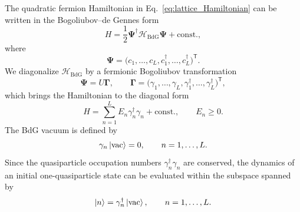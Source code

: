 \documentclass[reprint,amsmath,amssymb,aps,showkeys,superscriptaddress]{revtex4-2}
\begin{document}
The quadratic fermion Hamiltonian in
Eq.~\eqref{eq:lattice_Hamiltonian} can be written in the
Bogoliubov--de Gennes form
\begin{equation}
  H
  =
  \frac{1}{2}
  \boldsymbol{\Psi}^{\dagger}
  \mathcal{H}_{\mathrm{BdG}}
  \boldsymbol{\Psi}
  +\text{const.},
  \label{eq:real_space_BdG}
\end{equation}
where
\begin{equation}
  \boldsymbol{\Psi}
  =
  \bigl(
    c_1,\ldots,c_L,
    c_1^\dagger,\ldots,c_L^\dagger
  \bigr)^{\mathsf T}.
  \label{eq:real_space_Nambu}
\end{equation}
We diagonalize $\mathcal{H}_{\mathrm{BdG}}$ by a fermionic
Bogoliubov transformation
\begin{equation}
  \boldsymbol{\Psi}
  =
  U\boldsymbol{\Gamma},
  \qquad
  \boldsymbol{\Gamma}
  =
  \bigl(
    \gamma_1,\ldots,\gamma_L,
    \gamma_1^\dagger,\ldots,\gamma_L^\dagger
  \bigr)^{\mathsf T},
  \label{eq:Bogoliubov_transformation}
\end{equation}
which brings the Hamiltonian to the diagonal form
\begin{equation}
  H
  =
  \sum_{n=1}^{L}
  E_n\gamma_n^\dagger\gamma_n
   +\text{const.},
  \qquad
  E_n\geq0.
  \label{eq:diagonal_Hamiltonian}
\end{equation}
The BdG vacuum is defined by
\begin{equation}
  \gamma_n\ket{\mathrm{vac}}=0,
  \qquad
  n=1,\ldots,L.
  \label{eq:BdG_vacuum}
\end{equation}
Since the quasiparticle occupation numbers
$\gamma_n^\dagger\gamma_n$ are conserved, the dynamics of an
initial one-quasiparticle state can be evaluated within the subspace
spanned by
\begin{equation}
  \ket{n}
  =
  \gamma_n^\dagger\ket{\mathrm{vac}},
  \qquad
  n=1,\ldots,L.
  \label{eq:one_quasiparticle_basis}
\end{equation}
\end{document}
